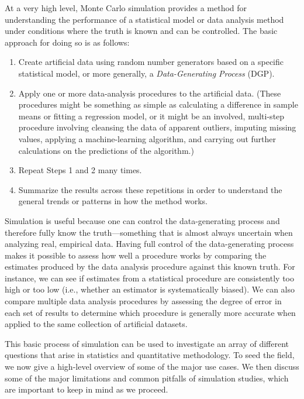 \documentclass[
]{book}
\providecommand{\tightlist}{%
  \setlength{\itemsep}{0pt}\setlength{\parskip}{0pt}}
\begin{document}
At a very high level, Monte Carlo simulation provides a method for understanding the performance of a statistical model or data analysis method under conditions where the truth is known and can be controlled.
The basic approach for doing so is as follows:

\begin{enumerate}
\def\labelenumi{\arabic{enumi}.}
\tightlist
\item
  Create artificial data using random number generators based on a specific statistical model, or more generally, a \emph{Data-Generating Process} (DGP).
\item
  Apply one or more data-analysis procedures to the artificial data. (These procedures might be something as simple as calculating a difference in sample means or fitting a regression model, or it might be an involved, multi-step procedure involving cleansing the data of apparent outliers, imputing missing values, applying a machine-learning algorithm, and carrying out further calculations on the predictions of the algorithm.)
\item
  Repeat Steps 1 and 2 many times.
\item
  Summarize the results across these repetitions in order to understand the general trends or patterns in how the method works.
\end{enumerate}

Simulation is useful because one can control the data-generating process and therefore fully know the truth---something that is almost always uncertain when analyzing real, empirical data.
Having full control of the data-generating process makes it possible to assess how well a procedure works by comparing the estimates produced by the data analysis procedure against this known truth.
For instance, we can see if estimates from a statistical procedure are consistently too high or too low (i.e., whether an estimator is systematically biased).
We can also compare multiple data analysis procedures by assessing the degree of error in each set of results to determine which procedure is generally more accurate when applied to the same collection of artificial datasets.

This basic process of simulation can be used to investigate an array of different questions that arise in statistics and quantitative methodology.
To seed the field, we now give a high-level overview of some of the major use cases. We then discuss some of the major limitations and common pitfalls of simulation studies, which are important to keep in mind as we proceed.
\end{document}
